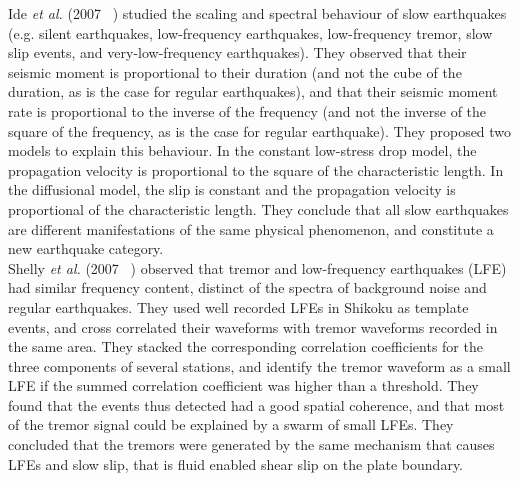 \documentclass[main.tex]{subfiles}
\begin{document}
Ide \textit{et al.} (2007 ~\cite{IDE_2007_nature}) studied the scaling and spectral behaviour of slow earthquakes (e.g. silent earthquakes, low-frequency earthquakes, low-frequency tremor, slow slip events, and very-low-frequency earthquakes). They observed that their seismic moment is proportional to their duration (and not the cube of the duration, as is the case for regular earthquakes), and that their seismic moment rate is proportional to the inverse of the frequency (and not the inverse of the square of the frequency, as is the case for regular earthquake). They proposed two models to explain this behaviour. In the constant low-stress drop model, the propagation velocity is proportional to the square of the characteristic length. In the diffusional model, the slip is constant and the propagation velocity is proportional of the characteristic length. They conclude that all slow earthquakes are different manifestations of the same physical phenomenon, and constitute a new earthquake category. \\

Shelly \textit{et al.} (2007 ~\cite{SHE_2007_nature}) observed that tremor and low-frequency earthquakes (LFE) had similar frequency content, distinct of the spectra of background noise and regular earthquakes. They used well recorded LFEs in Shikoku as template events, and cross correlated their waveforms with tremor waveforms recorded in the same area. They stacked the corresponding correlation coefficients for the three components of several stations, and identify the tremor waveform as a small LFE if the summed correlation coefficient was higher than a threshold. They found that the events thus detected had a good spatial coherence, and that most of the tremor signal could be explained by a swarm of small LFEs. They concluded that the tremors were generated by the same mechanism that causes LFEs and slow slip, that is fluid enabled shear slip on the plate boundary. \\
\end{document}
